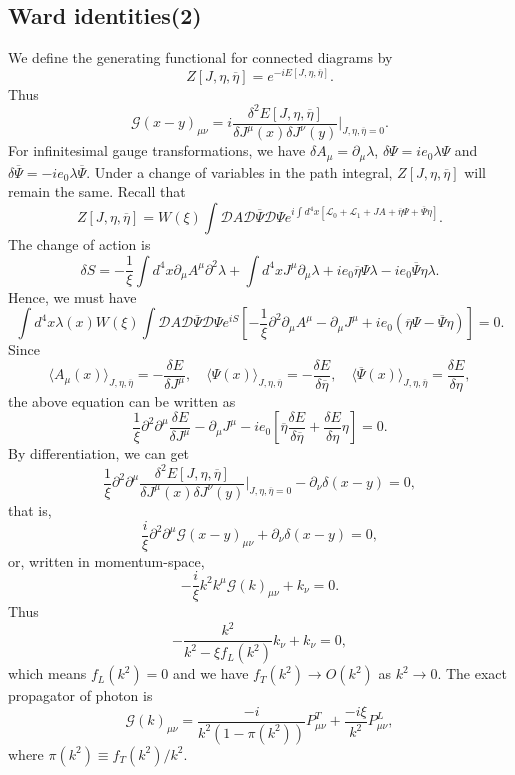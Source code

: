 \subsection{Ward identities(2)}
We define the generating functional for connected diagrams by
\[Z[J,\eta,\overline{\eta}] = e^{-iE[J,\eta,\overline{\eta}]}.\]
Thus
\[\mathcal{G}(x-y)_{\mu\nu} = i  \frac{\delta^2 E[J,\eta,\overline{\eta}]}{\delta J^{\mu}(x) \delta J^{\nu}(y)}\bigg|_{J,\eta,\overline{\eta}=0}.\]
For infinitesimal gauge transformations, we have $\delta A_{\mu} = \partial_{\mu} \lambda $, $\delta \Psi = ie_0\lambda\Psi$ and $\delta \overline{\Psi}  = -ie_0 \lambda \overline{\Psi}$. 
Under a change of variables in the path integral, $Z[J,\eta,\overline{\eta}]$ will remain the same. 
Recall that
\[Z[J,\eta,\overline{\eta}] = W(\xi) \int \mathcal{D}A \mathcal{D}\overline{\Psi} \mathcal{D}\Psi e^{i\int d^4x [\mathcal{L}_0 + \mathcal{L}_1 + JA + \overline{\eta}\Psi + \overline{\Psi}\eta]} .\]
The change of action is
\[\delta S = -\frac{1}{\xi} \int d^4x \partial_{\mu} A^{\mu} \partial^2 \lambda + \int d^4x J^{\mu}\partial_{\mu}\lambda + ie_0\overline{\eta}\Psi\lambda - ie_0\overline{\Psi}\eta\lambda.\]
Hence, we must have
\[\int d^4x \lambda(x) W(\xi)\int \mathcal{D}A \mathcal{D}\overline{\Psi} \mathcal{D}\Psi e^{iS} \left[ -\frac{1}{\xi} \partial^2 \partial_{\mu} A^{\mu} - \partial_{\mu}J^{\mu}  + ie_0(\overline{\eta}\Psi - \overline{\Psi}\eta)\right] = 0 .\]
Since
\[\langle A_{\mu}(x) \rangle_{J,\eta,\overline{\eta}} = - \frac{\delta E}{\delta J^{\mu}} , \quad \langle \Psi(x) \rangle_{J,\eta,\overline{\eta}} = - \frac{\delta E}{\delta \overline{\eta}} , \quad \langle \overline{\Psi}(x) \rangle_{J,\eta,\overline{\eta}} =  \frac{\delta E}{\delta \eta},\]
the above equation can be written as
\[\frac{1}{\xi} \partial^2 \partial^{\mu}\frac{\delta E}{\delta J^{\mu}} - \partial_{\mu}J^{\mu} - ie_0\left[ \overline{\eta}\frac{\delta E}{\delta \overline{\eta}} + \frac{\delta E}{\delta \eta} \eta \right]=0.\]
By differentiation, we can get
\[\frac{1}{\xi} \partial^2 \partial^{\mu} \frac{\delta^2 E[J,\eta,\overline{\eta}]}{\delta J^{\mu}(x) \delta J^{\nu}(y)}\bigg|_{J,\eta,\overline{\eta}=0} - \partial_{\nu} \delta(x-y) = 0,\]
that is,
\[\frac{i}{\xi}\partial^2 \partial^{\mu} \mathcal{G}(x-y)_{\mu\nu}+ \partial_{\nu} \delta(x-y) = 0 ,\]
or, written in momentum-space,
\[-\frac{i}{\xi}k^2 k^{\mu} \mathcal{G}(k)_{\mu\nu}+ k_{\nu} = 0.\]
Thus
\[- \frac{k^2}{k^2-\xi f_L(k^2)} k_{\nu} + k_{\nu} = 0,\]
which means $f_L(k^2) =0$ and we have $f_T(k^2) \to O(k^2)$ as $k^2 \to 0$. 
The exact propagator of photon is
\[\mathcal{G}(k)_{\mu\nu} = \frac{-i}{k^2(1-\pi(k^2))}P^T_{\mu\nu} + \frac{-i\xi}{k^2} P^L_{\mu\nu},\]
where $\pi(k^2) \equiv {f_T(k^2)}/{k^2}$.


